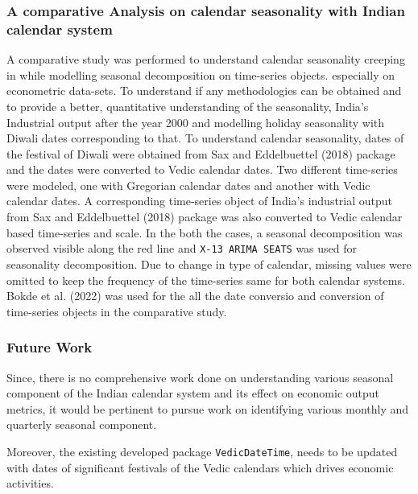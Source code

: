\documentclass[
]{article}
\begin{document}
\hypertarget{a-comparative-analysis-on-calendar-seasonality-with-indian-calendar-system}{%
\subsubsection{A comparative Analysis on calendar seasonality with
Indian calendar
system}\label{a-comparative-analysis-on-calendar-seasonality-with-indian-calendar-system}}

A comparative study was performed to understand calendar seasonality
creeping in while modelling seasonal decomposition on time-series
objects. especially on econometric data-sets. To understand if any
methodologies can be obtained and to provide a better, quantitative
understanding of the seasonality, India's Industrial output after the
year 2000 and modelling holiday seasonality with Diwali dates
corresponding to that. To understand calendar seasonality, dates of the
festival of Diwali were obtained from Sax and Eddelbuettel (2018)
package and the dates were converted to Vedic calendar dates. Two
different time-series were modeled, one with Gregorian calendar dates
and another with Vedic calendar dates. A corresponding time-series
object of India's industrial output from Sax and Eddelbuettel (2018)
package was also converted to Vedic calendar based time-series and
scale. In the both the cases, a seasonal decomposition was observed
visible along the red line and \texttt{X-13\ ARIMA\ SEATS} was used for
seasonality decomposition. Due to change in type of calendar, missing
values were omitted to keep the frequency of the time-series same for
both calendar systems. Bokde et al. (2022) was used for the all the date
conversio and conversion of time-series objects in the comparative
study.

\hypertarget{future-work}{%
\subsubsection{Future Work}\label{future-work}}

Since, there is no comprehensive work done on understanding various
seasonal component of the Indian calendar system and its effect on
economic output metrics, it would be pertinent to pursue work on
identifying various monthly and quarterly seasonal component.

Moreover, the existing developed package \texttt{VedicDateTime}, needs
to be updated with dates of significant festivals of the Vedic calendars
which drives economic activities.
\end{document}
